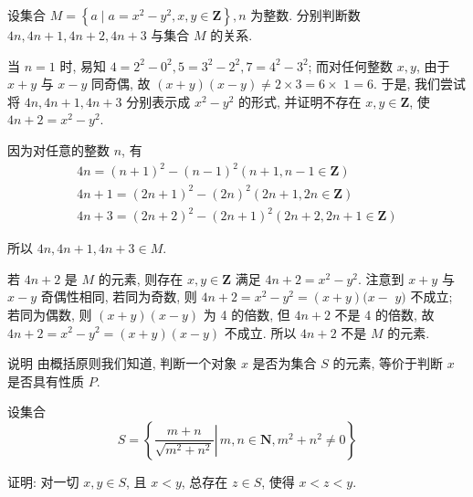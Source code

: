 \begin{example}
	设集合 $M=\left\{a \mid a=x^{2}-y^{2}, x, y \in \mathbf{Z}\right\}, n$ 为整数. 分别判断数 $4 n ,  4 n+1 ,  4 n+2 ,  4 n+3$ 与集合 $M$ 的关系.
\end{example}

\begin{analysis}
	当 $n=1$ 时, 易知 $4=2^{2}-0^{2}, 5=3^{2}-2^{2}, 7=4^{2}-3^{2}$; 而对任何整数 $x ,  y$, 由于 $x+y$ 与 $x-y$ 同奇偶, 故 $(x+y)(x-y) \neq 2 \times 3=6 \times$ $1=6$. 于是, 我们尝试将 $4 n ,  4 n+1 ,  4 n+3$ 分别表示成 $x^{2}-y^{2}$ 的形式, 并证明不存在 $x, y \in \mathbf{Z}$, 使 $4 n+2=x^{2}-y^{2}$.
\end{analysis}

\begin{solution}
	因为对任意的整数 $n$, 有
	\begin{gather*}
		4 n=(n+1)^{2}-(n-1)^{2}(n+1, n-1 \in \mathbf{Z}) \\
		4 n+1=(2 n+1)^{2}-(2 n)^{2}(2 n+1,2 n \in \mathbf{Z}) \\
		4 n+3=(2 n+2)^{2}-(2 n+1)^{2}(2 n+2,2 n+1 \in \mathbf{Z})
	\end{gather*}

	所以 $4 n, 4 n+1,4 n+3 \in M$.

	若 $4 n+2$ 是 $M$ 的元素, 则存在 $x, y \in \mathbf{Z}$ 满足 $4 n+2=x^{2}-y^{2}$. 注意到 $x+y$ 与 $x-y$ 奇偶性相同, 若同为奇数, 则 $4 n+2=x^{2}-y^{2}=(x+y)(x-$ $y)$ 不成立; 若同为偶数, 则 $(x+y)(x-y)$ 为 4 的倍数, 但 $4 n+2$ 不是 4 的倍数, 故 $4 n+2=x^{2}-y^{2}=(x+y)(x-y)$ 不成立. 所以 $4 n+2$ 不是 $M$ 的元素.

	说明 由概括原则我们知道, 判断一个对象 $x$ 是否为集合 $S$ 的元素, 等价于判断 $x$ 是否具有性质 $P$.
\end{solution}

\begin{example}
	设集合
	$$
		S=\left\{\left.\frac{m+n}{\sqrt{m^{2}+n^{2}}} \right\rvert\, m, n \in \mathbf{N}, m^{2}+n^{2} \neq 0\right\}
	$$

	证明: 对一切 $x, y \in S$, 且 $x<y$, 总存在 $z \in S$, 使得 $x<z<y$.
\end{example}

